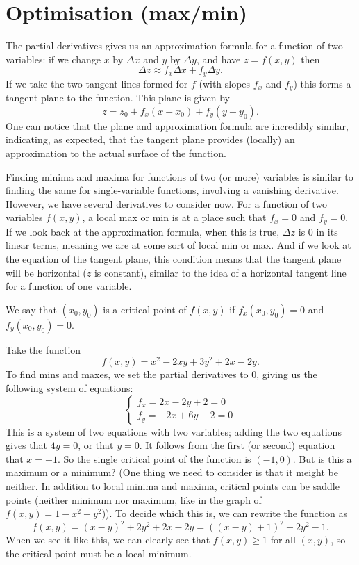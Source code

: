 \section{Optimisation (max/min)}

The partial derivatives gives us an approximation formula for a function of two variables: if we change $x$ by $\Delta x$ and $y$ by $\Delta y$, and have $z=f(x,y)$ then 
\[ \Delta z \approx f_x\Delta x + f_y \Delta y. \]
If we take the two tangent lines formed for $f$ (with slopes $f_x$ and $f_y$) this forms a tangent plane to the function. This plane is given by
\[ z = z_0 + f_x(x-x_0) + f_y(y-y_0). \]
One can notice that the plane and approximation formula are incredibly similar, indicating, as expected, that the tangent plane provides (locally) an approximation to the actual surface of the function.

Finding minima and maxima for functions of two (or more) variables is similar to finding the same for single-variable functions, involving a vanishing derivative. However, we have several derivatives to consider now. For a function of two variables $f(x,y)$, a local max or min is at a place such that $f_x = 0$ and $f_y=0$. If we look back at the approximation formula, when this is true, $\Delta z$ is 0 in its linear terms, meaning we are at some sort of local min or max. And if we look at the equation of the tangent plane, this condition means that the tangent plane will be horizontal ($z$ is constant), similar to the idea of a horizontal tangent line for a function of one variable. 

\bdf
We say that $(x_0,y_0)$ is a critical point of $f(x,y)$ if $f_x(x_0,y_0) = 0$ and $f_y(x_0,y_0)=0$.
\edf

\bex
Take the function 
\[ f(x,y) = x^2-2xy+3y^2+2x-2y. \]
To find mins and maxes, we set the partial derivatives to 0, giving us the following system of equations:
\[\begin{cases} f_x = 2x-2y+2 = 0 \\
 f_y = -2x + 6y -2 = 0 
\end{cases}\]
This is a system of two equations with two variables; adding the two equations gives that $4y = 0$, or that $y=0$. It follows from the first (or second) equation that $x=-1$. So the single critical point of the function is $(-1, 0)$. But is this a maximum or a minimum? (One thing we need to consider is that it meight be neither. In addition to local minima and maxima, critical points can be saddle points (neither minimum nor maximum, like in the graph of $f(x,y) = 1-x^2+y^2$)). To decide which this is, we can rewrite the function as
\[ f(x,y) = (x-y)^2 + 2y^2 + 2x-2y = ((x-y)+1)^2 + 2y^2 - 1. \]
When we see it like this, we can clearly see that $f(x,y) \ge 1$ for all $(x,y)$, so the critical point must be a local minimum. 
\eex

